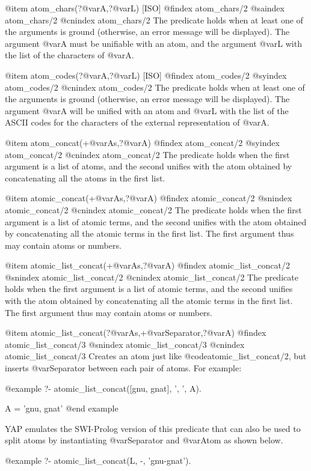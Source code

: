 {{{{@item atom_chars(?@var{A},?@var{L}) [ISO]
@findex atom_chars/2
@saindex atom_chars/2
@cnindex atom_chars/2
The predicate holds when at least one of the arguments is ground
(otherwise, an error message will be displayed). The argument @var{A} must
be unifiable with an atom, and the argument @var{L} with the list of the
characters of @var{A}.

@item atom_codes(?@var{A},?@var{L}) [ISO]
@findex atom_codes/2
@syindex atom_codes/2
@cnindex atom_codes/2
The predicate holds when at least one of the arguments is ground
(otherwise, an error message will be displayed). The argument @var{A} will
be unified with an atom and @var{L} with the list of the ASCII
codes for the characters of the external representation of @var{A}.

@item atom_concat(+@var{As},?@var{A})
@findex atom_concat/2
@syindex atom_concat/2
@cnindex atom_concat/2
The predicate holds when the first argument is a list of atoms, and the
second unifies with the atom obtained by concatenating all the atoms in
the first list.

@item atomic_concat(+@var{As},?@var{A})
@findex atomic_concat/2
@snindex atomic_concat/2
@cnindex atomic_concat/2
The predicate holds when the first argument is a list of atomic terms, and
the second unifies with the atom obtained by concatenating all the
atomic terms in the first list. The first argument thus may contain
atoms or numbers.

@item atomic_list_concat(+@var{As},?@var{A})
@findex atomic_list_concat/2
@snindex atomic_list_concat/2
@cnindex atomic_list_concat/2
The predicate holds when the first argument is a list of atomic terms, and
the second unifies with the atom obtained by concatenating all the
atomic terms in the first list. The first argument thus may contain
atoms or numbers.

@item atomic_list_concat(?@var{As},+@var{Separator},?@var{A})
@findex atomic_list_concat/3
@snindex atomic_list_concat/3
@cnindex atomic_list_concat/3
Creates an atom just like @code{atomic_list_concat/2}, but inserts
@var{Separator} between each pair of atoms. For example:

@example
?- atomic_list_concat([gnu, gnat], ', ', A).

A = 'gnu, gnat'
@end example

YAP emulates the SWI-Prolog version of this predicate that can also be
used to split atoms by instantiating @var{Separator} and @var{Atom} as
shown below.

@example
?- atomic_list_concat(L, -, 'gnu-gnat').

}}}}
